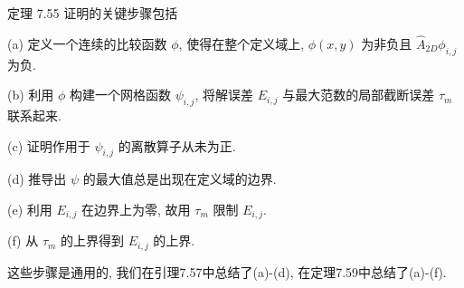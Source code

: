 \documentclass[a4paper]{ctexart}
\begin{document}
定理 7.55 证明的关键步骤包括

(a) 定义一个连续的比较函数 $\phi$, 使得在整个定义域上, $\phi(x, y)$ 
为非负且 $\hat{A}_{2D} \phi_{i,j}$ 为负.

(b) 利用 $\phi$ 构建一个网格函数 $\psi_{i,j}$, 
将解误差 $E_{i,j}$ 与最大范数的局部截断误差 $\tau_m$ 联系起来.

(c) 证明作用于 $\psi_{i,j}$ 的离散算子从未为正. 

(d) 推导出 $\psi$ 的最大值总是出现在定义域的边界.

(e) 利用 $E_{i,j}$ 在边界上为零, 故用 $\tau_m$ 限制 $E_{i,j}$.

(f) 从 $\tau_m$ 的上界得到 $E_{i,j}$ 的上界.

这些步骤是通用的, 我们在引理7.57中总结了(a)-(d), 在定理7.59中总结了(a)-(f).


\end{document}

